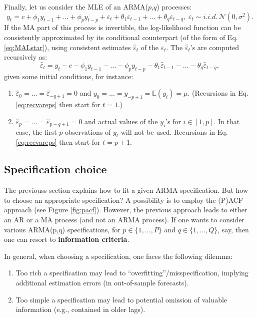 \documentclass[
  12pt,
]{book}
\providecommand{\tightlist}{%
  \setlength{\itemsep}{0pt}\setlength{\parskip}{0pt}}
\theoremstyle{definition}
\theoremstyle{definition}
\theoremstyle{definition}
\theoremstyle{definition}
\theoremstyle{remark}
\begin{document}
Finally, let us consider the MLE of an ARMA(\(p\),\(q\)) processes:
\[
y_t = c + \phi_1 y_{t-1} + \dots + \phi_p y_{t-p} + \varepsilon_t + \theta_1 \varepsilon_{t-1} +
\dots + \theta_q \varepsilon_{t-q} , \; \varepsilon_t \sim i.i.d.\,\mathcal{N}(0,\sigma^2).
\]
If the MA part of this process is invertible, the log-likelihood function can be consistently approximated by its conditional counterpart (of the form of Eq. \eqref{eq:MALstar}), using consistent estimates \(\hat\varepsilon_t\) of the \(\varepsilon_t\). The \(\hat\varepsilon_t\)'s are computed recursively as:
\begin{equation}
\hat\varepsilon_t = y_t - c - \phi_1 y_{t-1} - \dots - \phi_p y_{t-p} - \theta_1 \hat\varepsilon_{t-1} - \dots - \theta_q \hat\varepsilon_{t-q},\label{eq:recvareps}
\end{equation}
given some initial conditions, for instance:

\begin{enumerate}
\def\labelenumi{\alph{enumi}.}
\tightlist
\item
  \(\hat\varepsilon_0=\dots=\hat\varepsilon_{-q+1}=0\) and \(y_{0}=\dots=y_{-p+1}=\mathbb{E}(y_i)=\mu\). (Recursions in Eq. \eqref{eq:recvareps} then start for \(t=1\).)
\item
  \(\hat\varepsilon_p=\dots=\hat\varepsilon_{p-q+1}=0\) and actual values of the \(y_{i}\)'s for \(i \in [1,p]\). In that case, the first \(p\) observations of \(y_t\) will not be used. Recursions in Eq. \eqref{eq:recvareps} then start for \(t=p+1\).
\end{enumerate}

\hypertarget{specification-choice}{%
\subsection{Specification choice}\label{specification-choice}}

The previouss section explains how to fit a given ARMA specification. But how to choose an appropriate specification? A possibility is to employ the (P)ACF approach (see Figure \ref{fig:pacf}). However, the previous approach leads to either an AR or a MA process (and not an ARMA process). If one wants to consider various ARMA(p,q) specifications, for \(p \in \{1,\dots,P\}\) and \(q \in \{1,\dots,Q\}\), say, then one can resort to \textbf{information criteria}.

In general, when choosing a specification, one faces the following dilemma:

\begin{enumerate}
\def\labelenumi{\alph{enumi}.}
\tightlist
\item
  Too rich a specification may lead to ``overfitting''/misspecification, implying additional estimation errors (in out-of-sample forecasts).
\item
  Too simple a specification may lead to potential omission of valuable information (e.g., contained in older lags).
\end{enumerate}
\end{document}
